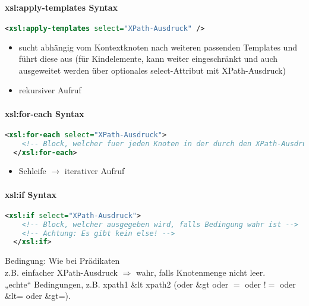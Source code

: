 \paragraph{xsl:apply-templates Syntax}\hspace{1mm}
\begin{lstlisting}[caption={xsl:apply-templates Syntax}, label={lst:xsl:apply-templates}, language={XML}]
  <xsl:apply-templates select="XPath-Ausdruck" />
\end{lstlisting}
\begin{itemize}
\item sucht abhängig vom Kontextknoten nach weiteren passenden Templates und führt diese aus (für Kindelemente, kann weiter eingeschränkt und auch ausgeweitet werden über optionales select-Attribut mit XPath-Ausdruck)
\item rekursiver Aufruf
\end{itemize}

\paragraph{xsl:for-each Syntax}\hspace{1mm}
\begin{lstlisting}[caption={xsl:for-each Syntax}, label={lst:xsl:for-each}, language={XML}]
  <xsl:for-each select="XPath-Ausdruck">
    <!-- Block, welcher fuer jeden Knoten in der durch den XPath-Ausdruck bestimmten Knotenmenge ausgegeben wird - relative Position im Dokumentbaum entspricht diesem Knoten -->
  </xsl:for-each>
\end{lstlisting}
\begin{itemize}
\item Schleife $\rightarrow$ iterativer Aufruf
\end{itemize}

\paragraph{xsl:if Syntax}\hspace{1mm}
\begin{lstlisting}[caption={xsl:if Syntax}, label={lst:xsl:if}, language={XML}]
  <xsl:if select="XPath-Ausdruck">
    <!-- Block, welcher ausgegeben wird, falls Bedingung wahr ist -->
    <!-- Achtung: Es gibt kein else! -->
  </xsl:if>
\end{lstlisting}
Bedingung: Wie bei Prädikaten\\
z.B. einfacher XPath-Ausdruck $\Rightarrow$ wahr, falls Knotenmenge nicht leer.\\
„echte“ Bedingungen, z.B. xpath1 \&lt xpath2 (oder \&gt oder $=$ oder $!=$ oder \&lt= oder \&gt=).

